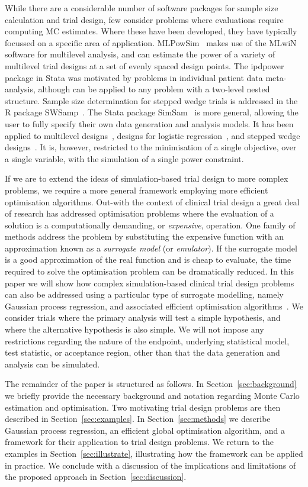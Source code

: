 \documentclass{article} %
\begin{document}
While there are a considerable number of software packages for sample size calculation and trial design, few consider problems where evaluations require computing MC estimates. Where these have been developed, they have typically focussed on a specific area of application. MLPowSim~\cite{Browne2009} makes use of the MLwiN software for multilevel analysis, and can estimate the power of a variety of multilevel trial designs at a set of evenly spaced design points. The ipdpower package in Stata was motivated by problems in individual patient data meta-analysis, although can be applied to any problem with a two-level nested structure. Sample size determination for stepped wedge trials is addressed in the R package SWSamp~\cite{Baio2015}. The Stata package SimSam~\cite{Hooper2013} is more general, allowing the user to fully specify their own data generation and analysis models. It has been applied to multilevel designs~\cite{Hooper2013}, designs for logistic regression~\cite{Grieve2016}, and stepped wedge designs~\cite{Hooper2016}. It is, however, restricted to the minimisation of a single objective, over a single variable, with the simulation of a single power constraint. 

If we are to extend the ideas of simulation-based trial design to more complex problems, we require a more general framework employing more efficient optimisation algorithms. Out-with the context of clinical trial design a great deal of research has addressed optimisation problems where the evaluation of a solution is a computationally demanding, or \emph{expensive}, operation. One family of methods address the problem by substituting the expensive function with an approximation known as a \emph{surrogate model} (or \emph{emulator}). If the surrogate model is a good approximation of the real function and is cheap to evaluate, the time required to solve the optimisation problem can be dramatically reduced.  In this paper we will show how complex simulation-based clinical trial design problems can also be addressed using a particular type of surrogate modelling, namely Gaussian process regression, and associated efficient optimisation algorithms~\cite{Jones2001}. We consider trials where the primary analysis will test a simple hypothesis, and where the alternative hypothesis is also simple. We will not impose any restrictions regarding the nature of the endpoint, underlying statistical model, test statistic, or acceptance region, other than that the data generation and analysis can be simulated.

The remainder of the paper is structured as follows. In Section~\ref{sec:background} we briefly provide the necessary background and notation regarding Monte Carlo estimation and optimisation. Two motivating trial design problems are then described in Section~\ref{sec:examples}. In Section~\ref{sec:methods} we describe Gaussian process regression, an efficient global optimisation algorithm, and a framework for their application to trial design problems. We return to the examples in Section~\ref{sec:illustrate}, illustrating how the framework can be applied in practice. We conclude with a discussion of the implications and limitations of the proposed approach in Section~\ref{sec:discussion}.
\end{document}
